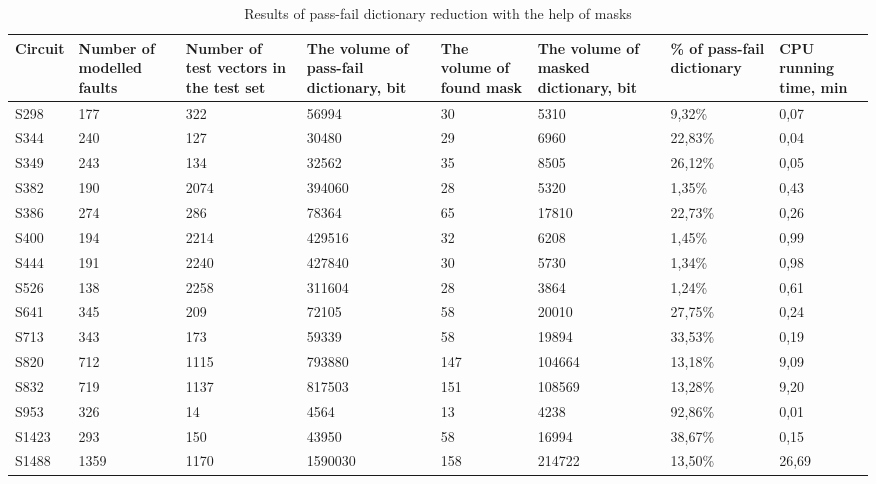 \documentclass[bachelor, och, pract]{SCWorks}
\begin{document}
\begin{table}[!ht]
	\footnotesize
	\caption{Results of pass-fail dictionary reduction with the help
	of masks} \label{table-2}
	\begin{tabular}{|p{1.5cm}|
	                 p{1.5cm}|
	                 p{1.5cm}|
	                 p{1.5cm}|
	                 p{1cm}|
	                 p{1.5cm}|
	                 p{1.5cm}|
	                 p{1cm}|}
		\hline \centering Circuit & Number of modelled faults & Number of test
		vectors in the test set & The volume of pass-fail dictionary,
		\linebreak bit & The volume of found mask & The volume of
		masked dictionary, \linebreak bit & \raggedright \% of pass-fail dictionary
		& CPU running time, \linebreak min
		\\
		\hline S298 & 177 & 322 & 56994 & 30 & 5310 & 9,32\% & 0,07\\
		\hline S344 & 240 & 127 & 30480 & 29 & 6960 & 22,83\% & 0,04\\
		\hline S349 & 243 & 134 & 32562 & 35 & 8505 & 26,12\% & 0,05\\
		\hline S382 & 190 & 2074 & 394060 & 28 & 5320 & 1,35\% & 0,43\\
		\hline S386 & 274 & 286 & 78364 & 65 & 17810 & 22,73\% & 0,26\\
		\hline S400 & 194 & 2214 & 429516 & 32 & 6208 & 1,45\% & 0,99\\
		\hline S444 & 191 & 2240 & 427840 & 30 & 5730 & 1,34\% & 0,98\\
		\hline S526 & 138 & 2258 & 311604 & 28 & 3864 & 1,24\% & 0,61\\
		\hline S641 & 345 & 209 & 72105 & 58 & 20010 & 27,75\% & 0,24\\
		\hline S713 & 343 & 173 & 59339 & 58 & 19894 & 33,53\% & 0,19\\
		\hline S820 & 712 & 1115 & 793880 & 147 & 104664 & 13,18\% & 9,09\\
		\hline S832 & 719 & 1137 & 817503 & 151 & 108569 & 13,28\% & 9,20\\
		\hline S953 & 326 & 14 & 4564 & 13 & 4238 & 92,86\% & 0,01\\
		\hline S1423 & 293 & 150 & 43950 & 58 & 16994 & 38,67\% & 0,15\\
		\hline S1488 & 1359 & 1170 & 1590030 & 158 & 214722 & 13,50\% & 26,69\\
		\hline
	\end{tabular}
\end{table}
\end{document}

